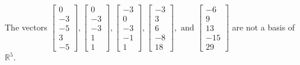 \begin{exercise}
\begin{exerciseStatement}
  \end{exerciseStatement}
  \begin{exerciseAnswer}
   The vectors \(\left[\begin{array}{r}
0 \\
-3 \\
-5 \\
3 \\
-5
\end{array}\right] , \left[\begin{array}{r}
0 \\
-3 \\
-3 \\
1 \\
1
\end{array}\right] , \left[\begin{array}{r}
-3 \\
0 \\
-3 \\
-1 \\
1
\end{array}\right] , \left[\begin{array}{r}
-3 \\
3 \\
6 \\
-8 \\
18
\end{array}\right] , \text{ and } \left[\begin{array}{r}
-6 \\
9 \\
13 \\
-15 \\
29
\end{array}\right]\) 
  	 are not  a basis of \(\mathbb{R}^5\).
  


  \end{exerciseAnswer}
\end{exercise}